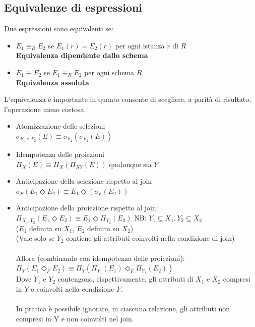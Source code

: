 \documentclass[../main.tex]{subfiles}
\begin{document}
	\subsection{Equivalenze di espressioni}
	Due espressioni sono equivalenti se:
	\begin{itemize}
		\item $E_1 \equiv_R E_2$ se $E_1(r)=E_2(r)$ per ogni istanza $r$ di $R$\\
		\textbf{Equivalenza dipendente dallo schema}
		\item $E_1\equiv E_2$ se $E_1 \equiv_R E_2$ per ogni schema $R$\\
		\textbf{Equivalenza assoluta}
	\end{itemize}
	L’equivalenza è importante in quanto consente di scegliere, a parità di risultato, l’operazione meno costosa.
	\begin{itemize}
		\item Atomizzazione delle selezioni\\
		$\sigma_{F_1 \wedge F_2} (E) \equiv \sigma_{F_1} (\sigma_{F_2} (E) )$
		\item Idempotenza delle proiezioni\\
		$\Pi_{X} (E) \equiv \Pi_{X} (\Pi_{XY} (E))$ qualunque sia $Y$
		\item Anticipazione della selezione rispetto al join\\
		$\sigma_F (E_1 \Diamond E_2) \equiv E_1 \Diamond (\sigma_F (E_2))$
		\item Anticipazione della proiezione rispetto al join:\\
		$\Pi_{X_1,Y_2} (E_1 \Diamond E_2) \equiv E_1 \Diamond \Pi_{Y_2} (E_2)$   {\color{red} NB: $Y_1 \subseteq X_1, Y_2 \subseteq X_2$ }\\
		($E_1$ definita su $X_1$, $E_2$ definita su $X_2$)\\
		(Vale solo se $Y_2$ contiene gli attributi coinvolti nella condizione di join)\\\\
		Allora (combinando con idempotenza delle proiezioni):\\
		$\Pi_Y (E_1 \Diamond_F E_2) \equiv \Pi_Y (\Pi_{Y_1} (E_1) \Diamond_F \Pi_{Y_2} (E_2))$\\
		Dove $Y_1$ e $Y_2$ contengono, rispettivamente, gli attributi di $X_1$ e $X_2$ compresi in $Y$ o coinvolti nella condizione $F$.\\\\
		In pratica è possibile ignorare, in ciascuna relazione, gli attributi non compresi in Y e non coinvolti nel join.

\end{itemize}
\end{document}
